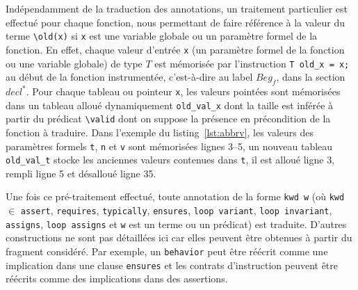 
Indépendamment de la traduction des annotations, un traitement particulier est
effectué pour chaque fonction, nous permettant de faire référence à la valeur
du terme \lstinline'\old(x)' si \lstinline'x' est une variable globale ou un
paramètre formel de la fonction.
En effet, chaque valeur d'entrée \lstinline'x' (un paramètre formel de la
fonction ou une variable globale) de type $T$ est mémorisée par
l'instruction \lstinline|T old_x = x;| au début de la fonction
instrumentée, c'est-à-dire au label $Beg_f$, dans la section $decl^{*}$.
Pour chaque tableau ou pointeur \lstinline'x', les valeurs pointées sont
mémorisées dans un tableau alloué dynamiquement \lstinline'old_val_x' dont la
taille est inférée à partir du prédicat \lstinline'\valid' dont on suppose la
présence en précondition de la fonction à traduire.
Dans l'exemple du listing~\ref{lst:abbrv}, les valeurs des paramètres formels
\lstinline|t|, \lstinline|n| et \lstinline|v| sont mémorisées lignes 3--5, un
nouveau tableau \lstinline|old_val_t| stocke les anciennes valeurs contenues
dans \lstinline|t|, il est alloué ligne 3, rempli ligne 5 et désalloué ligne 35.

Une fois ce pré-traitement effectué, toute annotation \eacsl de la forme
\lstinline'kwd w' (où \lstinline'kwd' $\in$ \bopen \lstinline|assert|,
\lstinline|requires|, \lstinline|typically|, \lstinline|ensures|,
\lstinline|loop variant|, \lstinline|loop invariant|, \lstinline|assigns|,
\lstinline|loop assigns| \bclose et \lstinline'w' est un terme ou un prédicat)
est traduite.
D'autres constructions \eacsl ne sont pas détaillées ici car elles peuvent être
obtenues à partir du fragment \eacsl considéré.
Par exemple, un \lstinline'behavior' peut être réécrit comme une implication
dans une clause \lstinline'ensures' et les contrats d'instruction peuvent être
réécrits comme des implications dans des assertions.





